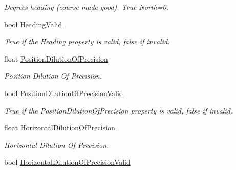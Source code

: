 \begin{DoxyCompactItemize}
\begin{DoxyCompactList}\small\item\em Degrees heading (course made good). True North=0. \item\end{DoxyCompactList}\item 
bool \hyperlink{class_g_p_s_mobile_1_1_gps_position_ad0c9ecaf766940f752cb27d2e39218c3}{HeadingValid}
\begin{DoxyCompactList}\small\item\em True if the Heading property is valid, false if invalid. \item\end{DoxyCompactList}\item 
float \hyperlink{class_g_p_s_mobile_1_1_gps_position_ae0acddfcb9ca7605363317986c086d69}{PositionDilutionOfPrecision}
\begin{DoxyCompactList}\small\item\em Position Dilution Of Precision. \item\end{DoxyCompactList}\item 
bool \hyperlink{class_g_p_s_mobile_1_1_gps_position_a2d422682471604af4f9839e06b705c1a}{PositionDilutionOfPrecisionValid}
\begin{DoxyCompactList}\small\item\em True if the PositionDilutionOfPrecision property is valid, false if invalid. \item\end{DoxyCompactList}\item 
float \hyperlink{class_g_p_s_mobile_1_1_gps_position_aaff94d337cfdd281fc058b4bc050b437}{HorizontalDilutionOfPrecision}
\begin{DoxyCompactList}\small\item\em Horizontal Dilution Of Precision. \item\end{DoxyCompactList}\item 
bool \hyperlink{class_g_p_s_mobile_1_1_gps_position_a2cf9490e66f5369dc17f9f7f885e9f3d}{HorizontalDilutionOfPrecisionValid}

\end{DoxyCompactItemize}
